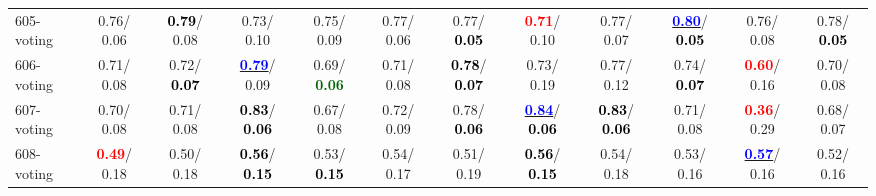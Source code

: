 \begin{table}[h]
\begin{center}
{\begin{tabular}{lc|c|c|c|c|c|c|c|c|c|c}
605-voting &   0.76/  0.06 & \textcolor{black}{\textbf{  0.79}}/  0.08 &   0.73/  0.10 &   0.75/  0.09 &   0.77/  0.06 &   0.77/\textcolor{black}{\textbf{  0.05}} & \textcolor{red}{\textbf{  0.71}}/  0.10 &   0.77/  0.07 & \underline{\textcolor{blue}{\textbf{  0.80}}}/\textcolor{black}{\textbf{  0.05}} &   0.76/  0.08 &   0.78/\textcolor{black}{\textbf{  0.05}} \\
606-voting &   0.71/  0.08 &   0.72/\textcolor{black}{\textbf{  0.07}} & \underline{\textcolor{blue}{\textbf{  0.79}}}/  0.09 &   0.69/\textcolor{darkgreen}{\textbf{  0.06}} &   0.71/  0.08 & \textcolor{black}{\textbf{  0.78}}/\textcolor{black}{\textbf{  0.07}} &   0.73/  0.19 &   0.77/  0.12 &   0.74/\textcolor{black}{\textbf{  0.07}} & \textcolor{red}{\textbf{  0.60}}/  0.16 &   0.70/  0.08 \\
607-voting &   0.70/  0.08 &   0.71/  0.08 & \textcolor{black}{\textbf{  0.83}}/\textcolor{black}{\textbf{  0.06}} &   0.67/  0.08 &   0.72/  0.09 &   0.78/\textcolor{black}{\textbf{  0.06}} & \underline{\textcolor{blue}{\textbf{  0.84}}}/\textcolor{black}{\textbf{  0.06}} & \textcolor{black}{\textbf{  0.83}}/\textcolor{black}{\textbf{  0.06}} &   0.71/  0.08 & \textcolor{red}{\textbf{  0.36}}/  0.29 &   0.68/  0.07 \\
608-voting & \textcolor{red}{\textbf{  0.49}}/  0.18 &   0.50/  0.18 & \textcolor{black}{\textbf{  0.56}}/\textcolor{black}{\textbf{  0.15}} &   0.53/\textcolor{black}{\textbf{  0.15}} &   0.54/  0.17 &   0.51/  0.19 & \textcolor{black}{\textbf{  0.56}}/\textcolor{black}{\textbf{  0.15}} &   0.54/  0.18 &   0.53/  0.16 & \underline{\textcolor{blue}{\textbf{  0.57}}}/  0.16 &   0.52/  0.16 \\\end{tabular}}\label{stratsALCKappa18AllReduxHalfa}
\end{center}
\end{table}

